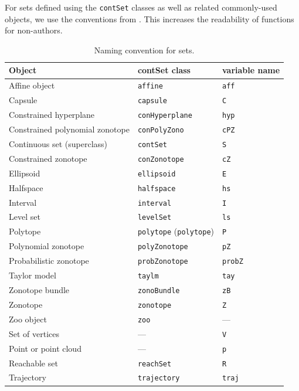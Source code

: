
%
For sets defined using the \verb|contSet| classes as well as related commonly-used objects, we use the conventions from .
This increases the readability of functions for non-authors.

\begin{table}[h]
\centering
\caption{Naming convention for sets.}
\label{tab:contSet}
\smallskip
\begin{tabular}{l l l}
	Object & contSet class & variable name \\ \toprule
	Affine object & \verb|affine| & \verb|aff| \\
	Capsule & \verb|capsule| & \verb|C| \\
	Constrained hyperplane & \verb|conHyperplane| & \verb|hyp| \\
	Constrained polynomial zonotope & \verb|conPolyZono| & \verb|cPZ| \\
	Continuous set (superclass) & \verb|contSet| & \verb|S| \\
	Constrained zonotope & \verb|conZonotope| & \verb|cZ| \\
	Ellipsoid & \verb|ellipsoid| & \verb|E| \\
	Halfspace & \verb|halfspace| & \verb|hs| \\
	Interval & \verb|interval| & \verb|I| \\
	Level set & \verb|levelSet| & \verb|ls| \\
	Polytope & \verb|polytope| (\verb|polytope|) & \verb|P| \\
	Polynomial zonotope & \verb|polyZonotope| & \verb|pZ| \\
	Probabilistic zonotope & \verb|probZonotope| & \verb|probZ| \\
	Taylor model & \verb|taylm| & \verb|tay| \\
	Zonotope bundle & \verb|zonoBundle| & \verb|zB| \\
	Zonotope & \verb|zonotope| & \verb|Z| \\
	Zoo object & \verb|zoo| & --- \\ \bottomrule
	Set of vertices & --- & \verb|V| \\
	Point or point cloud & --- & \verb|p| \\
	Reachable set & \verb|reachSet| & \verb|R| \\
	Trajectory & \verb|trajectory| & \verb|traj| \\ \bottomrule
\end{tabular}
\end{table}

